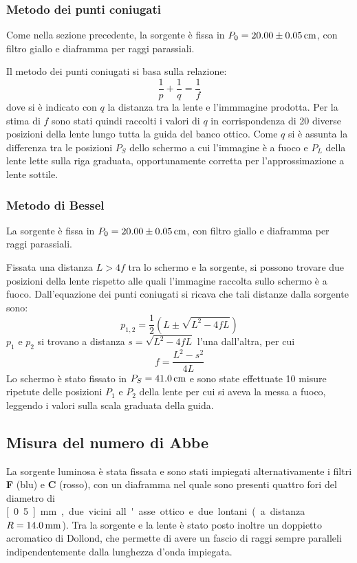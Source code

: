 \documentclass[italian,a4paper]{article}
\begin{document}
\subsubsection*{Metodo dei punti coniugati}
Come nella sezione precedente, la sorgente è fissa in $P_0=\unit[20.00 \pm 0.05]{cm}$, con filtro giallo e diaframma per raggi parassiali.

Il metodo dei punti coniugati si basa sulla relazione:
\begin{equation*}
\dfrac{1}{p}+\dfrac{1}{q}=\dfrac{1}{f}
\end{equation*}
dove si è indicato con $q$ la distanza tra la lente e l'immmagine prodotta.
Per la stima di $f$ sono stati quindi raccolti i valori di $q$ in corrispondenza di 20 diverse posizioni della lente lungo tutta la guida del banco ottico. Come $q$ si è assunta la differenza tra le posizioni $P_S$ dello schermo a cui l'immagine è a fuoco e $P_L$ della lente lette sulla riga graduata, opportunamente corretta per l'approssimazione a lente sottile.
\subsubsection*{Metodo di Bessel}
La sorgente è fissa in $P_0=\unit[20.00 \pm 0.05]{cm}$, con filtro giallo e diaframma per raggi parassiali.

Fissata una distanza $L>4f$ tra lo schermo e la sorgente, si possono trovare due posizioni della lente rispetto alle quali l'immagine raccolta sullo schermo è a fuoco. Dall'equazione dei punti coniugati si ricava che tali distanze dalla sorgente sono:
$$p_{1,2}=\dfrac{1}{2}\left(L\pm\sqrt{L^2-4fL}\right)$$
$p_1$ e $p_2$ si trovano a distanza $s=\sqrt{L^2-4fL}$ l'una dall'altra, per cui
\begin{equation*}
f=\dfrac{L^2-s^2}{4L}
\end{equation*}
Lo schermo è stato fissato in $P_S=\unit[41.0]{cm}$ e sono state effettuate 10 misure ripetute delle posizioni $P_1$ e $P_2$ della lente per cui si aveva la messa a fuoco, leggendo i valori sulla scala graduata della guida.
\subsection{Misura del numero di Abbe}
La sorgente luminosa è stata fissata e sono stati impiegati alternativamente i filtri \textbf{F} (blu) e \textbf{C} (rosso), con un diaframma nel quale sono presenti quattro fori del diametro di \unit[0.5]{mm}, due vicini all'asse ottico e due lontani (a distanza $R=\unit[14.0]{mm}$).
Tra la sorgente e la lente è stato posto inoltre un doppietto acromatico di Dollond, che permette di avere un fascio di raggi sempre paralleli indipendentemente dalla lunghezza d'onda impiegata.
\end{document}
